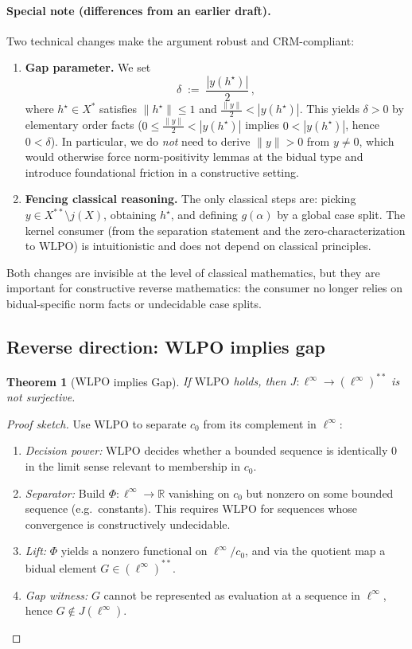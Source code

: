 \documentclass[11pt]{article}  %
\newtheorem{theorem}{Theorem}[section]
\newenvironment{thm}{\begin{theorem}}{\end{theorem}}
\newtheorem{theorem}{Theorem}[section]
\newenvironment{thm}{\begin{theorem}}{\end{theorem}}
\newcommand{\R}{\mathbb{R}}
\newcommand{\linf}{\ell^\infty}
\newcommand{\cnull}{c_0}
\newcommand{\WLPO}{\mathrm{WLPO}}
\begin{document}
\paragraph{Special note (differences from an earlier draft).}
Two technical changes make the argument robust and CRM-compliant:
\begin{enumerate}
  \item \textbf{Gap parameter.} We set
  \[
    \delta \;:=\; \frac{|y(h^\star)|}{2}\,,
  \]
  where $h^\star\in X^\ast$ satisfies $\|h^\star\|\le 1$ and
  $\tfrac{\|y\|}{2}<|y(h^\star)|$. This yields $\delta>0$ by elementary
  order facts ($0\le \tfrac{\|y\|}{2} < |y(h^\star)|$ implies $0<|y(h^\star)|$,
  hence $0<\delta$). In particular, we do \emph{not} need to derive $\|y\|>0$
  from $y\neq 0$, which would otherwise force norm-positivity lemmas at the bidual
  type and introduce foundational friction in a constructive setting.
  \item \textbf{Fencing classical reasoning.} The only classical steps are:
  picking $y\in X^{**}\!\setminus j(X)$, obtaining $h^\star$, and
  defining $g(\alpha)$ by a global case split. The kernel consumer
  (from the separation statement and the zero-characterization to $\WLPO$)
  is intuitionistic and does not depend on classical principles.
\end{enumerate}
Both changes are invisible at the level of classical mathematics, but they are
important for constructive reverse mathematics: the consumer no longer relies on
bidual-specific norm facts or undecidable case splits.

\subsection{Reverse direction: WLPO implies gap}

\begin{thm}[$\WLPO$ implies Gap]
If $\WLPO$ holds, then $J:\linf\to(\linf)^{**}$ is not surjective.
\end{thm}

\begin{proof}[Proof sketch]
Use $\WLPO$ to separate $\cnull$ from its complement in $\linf$:
\begin{enumerate}[label=\arabic*.]
\item \emph{Decision power:} $\WLPO$ decides whether a bounded sequence is identically $0$ in the limit sense relevant to membership in $\cnull$.
\item \emph{Separator:} Build $\Phi:\linf\to\R$ vanishing on $\cnull$ but nonzero on some bounded sequence (e.g.\ constants). This requires $\WLPO$ for sequences whose convergence is constructively undecidable.
\item \emph{Lift:} $\Phi$ yields a nonzero functional on $\linf/\cnull$, and via the quotient map a bidual element $G\in(\linf)^{**}$.
\item \emph{Gap witness:} $G$ cannot be represented as evaluation at a sequence in $\linf$, hence $G\notin J(\linf)$.
\end{enumerate}
\end{proof}
\end{document}
